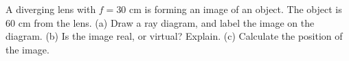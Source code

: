 A diverging lens with $f=30$ cm is forming an image
of an object. The object is 60 cm from the lens.
(a) Draw a ray diagram, and label the image on the diagram.
(b) Is the image real, or virtual? Explain.
(c) Calculate the  position of the image.
